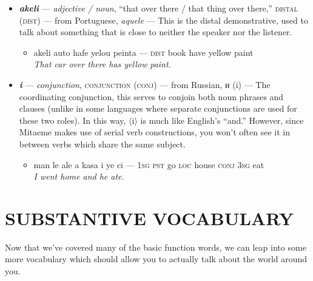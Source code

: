 \documentclass[a4paper, titlepage]{article}
\begin{document}
\begin{itemize}
	\begin{itemize}
		\item man na kan yena puka — \textsc{1sg neg} read \textsc{medi} book \\\textit{I am not reading that book. / I have not read that book.}
	\end{itemize}
	\item \textbf{\textit{akeli}} — \textit{adjective / noun}, ``that over there / that thing over there,'' \textsc{distal (dist)}  — from Portuguese, \textit{aquele} — This is the distal demonstrative, used to talk about something that is close to neither the speaker nor the listener.
	\begin{itemize}
		\item akeli auto hafe yelou peinta — \textsc{dist} book have yellow paint \\\textit{That car over there has yellow paint.}
	\end{itemize}
	\item \textbf{\textit{i}} — \textit{conjunction}, \textsc{conjunction (conj)}  — from Russian, и (i) — The coordinating conjunction, this serves to conjoin both noun phrases and clauses (unlike in some languages where separate conjunctions are used for these two roles). In this way, $\langle$i$\rangle$ is much like English's ``and.'' However, since Mitaeme makes use of serial verb constructions, you won't often see it in between verbs which share the same subject.
	\begin{itemize}
		\item man le ale a kasa i ye ci — \textsc{1sg pst} go \textsc{loc} house \textsc{conj 3sg} eat \\\textit{I went home and he ate.}
	\end{itemize}
\end{itemize}

\section{SUBSTANTIVE VOCABULARY}

Now that we've covered many of the basic function words, we can leap into some more vocabulary which should allow you to actually talk about the world around you.
\end{document}
